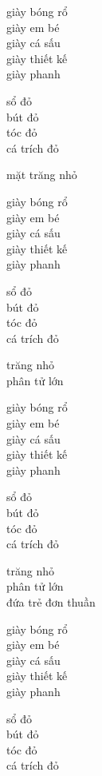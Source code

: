 \documentclass{article}
\begin{document}
\begin{huge}
giày bóng rổ\\
giày em bé\\
giày cá sấu \\
giày thiết kế \\
giày phanh

sổ đỏ\\
bút đỏ\\
tóc đỏ\\
cá trích đỏ

mặt trăng nhỏ


giày bóng rổ\\
giày em bé\\
giày cá sấu \\
giày thiết kế \\
giày phanh

sổ đỏ\\
bút đỏ\\
tóc đỏ\\
cá trích đỏ

trăng nhỏ\\
phân tử lớn


giày bóng rổ\\
giày em bé\\
giày cá sấu \\
giày thiết kế \\
giày phanh

sổ đỏ\\
bút đỏ\\
tóc đỏ\\
cá trích đỏ

trăng nhỏ\\
phân tử lớn \\
đứa trẻ đơn thuần


giày bóng rổ\\
giày em bé\\
giày cá sấu \\
giày thiết kế \\
giày phanh

sổ đỏ\\
bút đỏ\\
tóc đỏ\\
cá trích đỏ


\end{huge}
\end{document}
